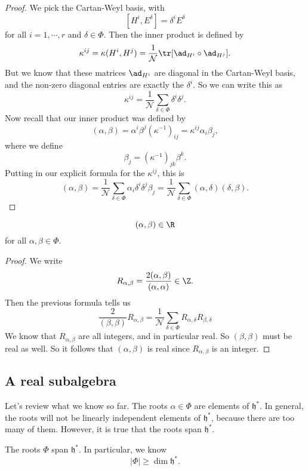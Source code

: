 \documentclass[a4paper]{article}
\begin{document}
\begin{proof}
  We pick the Cartan-Weyl basis, with
  \[
    [H^i, E^\delta] = \delta^i E^\delta
  \]
  for all $i = 1, \cdots, r$ and $\delta \in \Phi$. Then the inner product is defined by
  \[
    \kappa^{ij} = \kappa(H^i, H^j) = \frac{1}{\mathcal{N}} \tr [\ad_{H^i} \circ \ad_{H^j}].
  \]
  But we know that these matrices $\ad_{H^i}$ are diagonal in the Cartan-Weyl basis, and the non-zero diagonal entries are exactly the $\delta^i$. So we can write this as
  \[
    \kappa^{ij} = \frac{1}{\mathcal{N}} \sum_{\delta \in \Phi} \delta^i \delta^j.
  \]
  Now recall that our inner product was defined by
  \[
    (\alpha, \beta) = \alpha^i \beta^j (\kappa^{-1})_{ij} = \kappa^{ij} \alpha_i \beta_j,
  \]
  where we define
  \[
    \beta_j = (\kappa^{-1})_{jk} \beta^k.
  \]
  Putting in our explicit formula for the $\kappa^{ij}$, this is
  \[
    (\alpha, \beta) = \frac{1}{\mathcal{N}}\sum_{\delta \in \Phi} \alpha_i \delta^i \delta^j \beta_j = \frac{1}{\mathcal{N}}\sum_{\delta \in \Phi}(\alpha, \delta) (\delta, \beta).
  \]
\end{proof}

\begin{cor}
  \[
    (\alpha, \beta) \in \R
  \]
  for all $\alpha, \beta \in \Phi$.
\end{cor}

\begin{proof}
  We write
  \[
    R_{\alpha, \beta} = \frac{2(\alpha, \beta)}{(\alpha, \alpha)} \in \Z.
  \]
  Then the previous formula tells us
  \[
    \frac{2}{(\beta, \beta)} R_{\alpha, \beta} = \frac{1}{\mathcal{N}} \sum_{\delta \in \Phi} R_{\alpha, \delta} R_{\beta, \delta}
  \]
  We know that $R_{\alpha, \beta}$ are all integers, and in particular real. So $(\beta, \beta)$ must be real as well. So it follows that $(\alpha, \beta)$ is real since $R_{\alpha, \beta}$ is an integer.
\end{proof}

\subsection{A real subalgebra}
Let's review what we know so far. The roots $\alpha \in \Phi$ are elements of $\mathfrak{h}^*$. In general, the roots will not be linearly independent elements of $\mathfrak{h}^*$, because there are too many of them. However, it is true that the roots span $\mathfrak{h}^*$.

\begin{prop}
  The roots $\Phi$ span $\mathfrak{h}^*$. In particular, we know
  \[
    |\Phi| \geq \dim \mathfrak{h}^*.
  \]
\end{prop}
\end{document}

